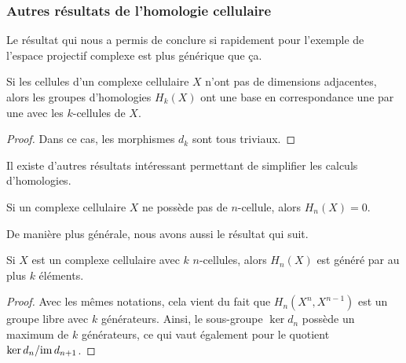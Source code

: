 \subsubsection{Autres résultats de l'homologie cellulaire}

Le résultat qui nous a permis de conclure si rapidement pour l'exemple de l'espace projectif complexe est plus générique que ça.

\begin{proposition}
Si les cellules d'un complexe cellulaire $X$ n'ont pas de dimensions adjacentes, alors les groupes d'homologies $H_k(X)$ ont une base en correspondance une par une avec les $k$-cellules de $X$.
\end{proposition}
\begin{proof}
Dans ce cas, les morphismes $d_k$ sont tous triviaux.
\end{proof}

Il existe d'autres résultats intéressant permettant de simplifier les calculs d'homologies. 

\begin{proposition}
Si un complexe cellulaire $X$ ne possède pas de $n$-cellule, alors $H_n(X)=0$.
\end{proposition}
De manière plus générale, nous avons aussi le résultat qui suit.
\begin{proposition}
Si $X$ est un complexe cellulaire avec $k$ $n$-cellules, alors $H_n(X)$ est généré par au plus $k$ éléments.
\end{proposition}
\begin{proof}
Avec les mêmes notations, cela vient du fait que $H_n(X^n,X^{n-1})$ est un groupe libre avec $k$ générateurs. Ainsi, le sous-groupe $\ker d_n$ possède un maximum de $k$ générateurs, ce qui vaut également pour le quotient $\ker d_n/\mathrm{im}\, d_{n+1}$.
\end{proof}